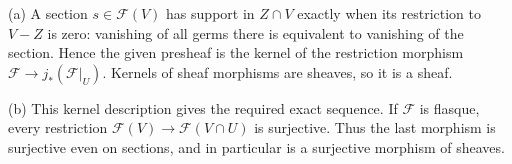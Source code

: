 (a) A section $s\in\mathscr F(V)$ has support in $Z\cap V$ exactly when its restriction to $V-Z$ is zero: vanishing of all germs there is equivalent to vanishing of the section. Hence the given presheaf is the kernel of the restriction morphism $\mathscr F\to j_*(\mathscr F|_U)$. Kernels of sheaf morphisms are sheaves, so it is a sheaf.

(b) This kernel description gives the required exact sequence. If $\mathscr F$ is flasque, every restriction $\mathscr F(V)\to\mathscr F(V\cap U)$ is surjective. Thus the last morphism is surjective even on sections, and in particular is a surjective morphism of sheaves.
